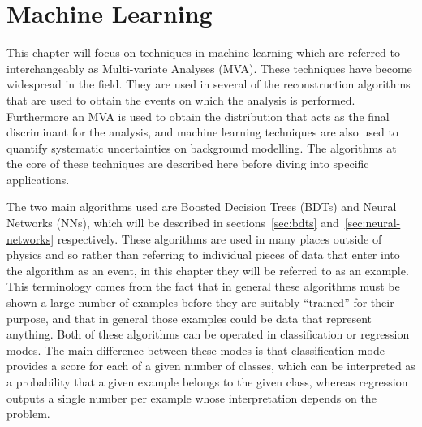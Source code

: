 \chapter{Machine Learning}%
\label{ch:ml}

This chapter will focus on techniques in machine learning which are referred
to interchangeably as Multi-variate Analyses (MVA). These techniques have
become widespread in the field. They are used in several of the
reconstruction algorithms that are used to obtain the events on which the
analysis is performed. Furthermore an MVA is used to obtain the distribution
that acts as the final discriminant for the analysis, and machine learning
techniques are also used to quantify systematic uncertainties on background
modelling. The algorithms at the core of these techniques are described here
before diving into specific applications.

The two main algorithms used are Boosted Decision Trees (BDTs) and Neural
Networks (NNs), which will be described in sections~\ref{sec:bdts}
and~\ref{sec:neural-networks} respectively. These algorithms are used in many
places outside of physics and so rather than referring to individual pieces of
data that enter into the algorithm as an event, in this chapter they will be
referred to as an example. This terminology comes from the fact that in
general these algorithms must be shown a large number of examples before they
are suitably ``trained'' for their purpose, and that in general those examples
could be data that represent anything. Both of these algorithms can be operated
in classification or regression modes. The main difference between these modes
is that classification mode provides a score for each of a given number of
classes, which can be interpreted as a probability that a given example belongs
to the given class, whereas regression outputs a single number per example whose
interpretation depends on the problem.

